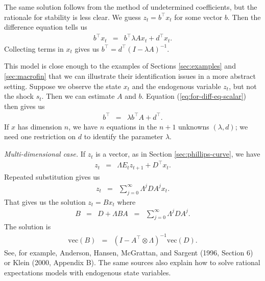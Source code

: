 \documentclass[11pt]{article}
\newcounter{tab}
\begin{document}
{The same solution follows from the method of undetermined coefficients,
but the rationale for stability is less clear.
We guess $ z_t = b^\top x_t$ for some vector $b$.
Then the difference equation tells us
\begin{eqnarray*}
    b^\top x_t &=&  b^\top \lambda A x_t + d^\top x_t .
\end{eqnarray*}
Collecting terms in $x_t$ gives us
$ b^\top =  d^\top (I-\lambda A)^{-1} $.

This model is close enough to the examples of Sections \ref{sec:examples} and \ref{sec:macrofin}
that we can illustrate their identification issues in a more abstract setting.
Suppose we observe the state $x_t$ and the endogenous variable $z_t$,
but not the shock $s_t$.
Then we can estimate $A$ and $b$.
Equation (\ref{eq:for-diff-eq-scalar}) then gives us
\begin{eqnarray*}
    b^\top &=& \lambda b^\top A + d^\top .
\end{eqnarray*}
If $x$ has dimension $n$, we have $n$ equations in the
$n+1$ unknowns $(\lambda, d)$;
we need one restriction on $d$ to identify the
parameter $\lambda$.


{\it Multi-dimensional case.\/}
If $z_t$ is a vector, as in Section \ref{sec:phillips-curve},
we have
\begin{eqnarray*}
    z_t &=&    \Lambda E_t z_{t+1} + D^\top x_{t} .
\end{eqnarray*}
Repeated substitution gives us
\begin{eqnarray*}
    z_t &=&  \sum_{j=0}^\infty \Lambda^j D A^j x_{t} .
\end{eqnarray*}
That gives us the solution $ z_t = B x_t$ where
\begin{eqnarray*}
    B &=& D + \Lambda B A \;\;=\;\; \sum_{j=0}^\infty \Lambda^j D A^j .
\end{eqnarray*}
The solution is
\begin{eqnarray*}
    \mbox{vec}(B) &=& (I - A^\top \otimes \Lambda)^{-1} \mbox{vec} (D) .
\end{eqnarray*}
See, for example,
Anderson, Hansen, McGrattan, and Sargent (1996, Section 6) or Klein (2000, Appendix B).
The same sources also explain how to solve
rational expectations models with endogenous state variables.


%


}
\end{document}
